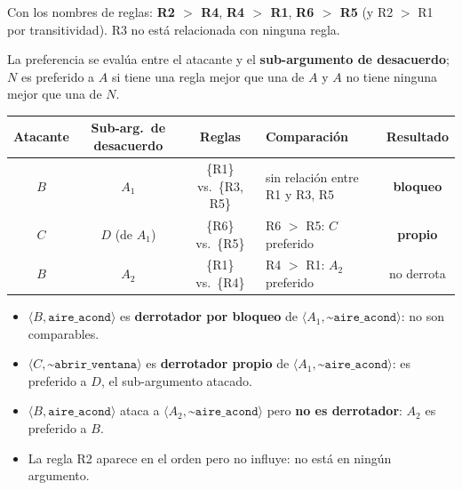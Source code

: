 \documentclass[11pt,a4paper]{article}
\newcommand{\nf}{\textasciitilde}                 %
\begin{document}
Con los nombres de reglas: \textbf{R2 $>$ R4}, \textbf{R4 $>$ R1}, \textbf{R6 $>$ R5} (y R2 $>$ R1 por transitividad). R3 no está relacionada con ninguna regla.

La preferencia se evalúa entre el atacante y el \textbf{sub-argumento de desacuerdo}; $N$ es preferido a $A$ si tiene una regla mejor que una de $A$ y $A$ no tiene ninguna mejor que una de $N$.

\begin{center}
\small
\begin{tabular}{@{}c c c l c@{}}
\toprule
\textbf{Atacante} & \textbf{Sub-arg.\ de desacuerdo} & \textbf{Reglas} & \textbf{Comparación} & \textbf{Resultado} \\
\midrule
$B$ & $A_1$ & \{R1\} vs.\ \{R3, R5\} & sin relación entre R1 y R3, R5 & \textbf{bloqueo} \\
$C$ & $D$ (de $A_1$) & \{R6\} vs.\ \{R5\} & R6 $>$ R5: $C$ preferido & \textbf{propio} \\
$B$ & $A_2$ & \{R1\} vs.\ \{R4\} & R4 $>$ R1: $A_2$ preferido & no derrota \\
\bottomrule
\end{tabular}
\end{center}

\begin{itemize}
  \item $\langle B, \texttt{aire\_acond}\rangle$ es \textbf{derrotador por bloqueo} de $\langle A_1, \texttt{\nf aire\_acond}\rangle$: no son comparables.
  \item $\langle C, \texttt{\nf abrir\_ventana}\rangle$ es \textbf{derrotador propio} de $\langle A_1, \texttt{\nf aire\_acond}\rangle$: es preferido a $D$, el sub-argumento atacado.
  \item $\langle B, \texttt{aire\_acond}\rangle$ ataca a $\langle A_2, \texttt{\nf aire\_acond}\rangle$ pero \textbf{no es derrotador}: $A_2$ es preferido a $B$.
  \item La regla R2 aparece en el orden pero no influye: no está en ningún argumento.
\end{itemize}
\end{document}

